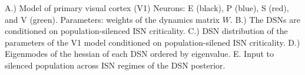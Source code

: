 A.) Model of primary visual cortex (V1) Neurons: E (black), P (blue), S (red), and V (green).  Parameters: weights of the dynamics matrix $W$.  B.) The DSNs are conditioned on population-silenced ISN criticality.  C.) DSN distribution of the parameters of the V1 model conditioned on population-silened ISN criticality.  D.) Eigenmodes of the hessian of each DSN ordered by eigenvalue.  E. Input to silenced population across ISN regimes of the DSN posterior.
